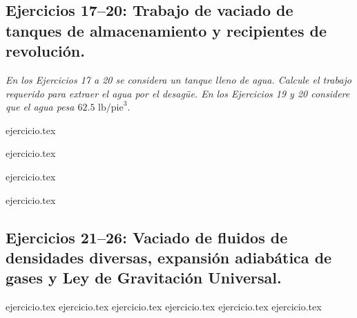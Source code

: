 \subsection*{Ejercicios 17--20: Trabajo de vaciado de tanques de almacenamiento y recipientes de revolución.}

\noindent \textit{En los Ejercicios 17 a 20 se considera un tanque lleno de agua. Calcule el trabajo requerido para extraer el agua por el desagüe. En los Ejercicios 19 y 20 considere que el agua pesa $62.5 \text{ lb/pie}^3$.}

\begin{enumerate}
    \setcounter{enumi}{16}
    \begin{minipage}{0.45\textwidth}
    {ejercicio.tex}
    \end{minipage}%
    \begin{minipage}{0.45\textwidth}
    {ejercicio.tex}
    \end{minipage}
    
    \begin{minipage}{0.45\textwidth}
    {ejercicio.tex}
    \end{minipage}%
    \begin{minipage}{0.45\textwidth}
    {ejercicio.tex}
    \end{minipage}
\end{enumerate}

\subsection*{Ejercicios 21--26: Vaciado de fluidos de densidades diversas, expansión adiabática de gases y Ley de Gravitación Universal.}

\begin{enumerate}
    \setcounter{enumi}{20}
    {ejercicio.tex}
    {ejercicio.tex}
    {ejercicio.tex}
    {ejercicio.tex}
    {ejercicio.tex}
    {ejercicio.tex}
\end{enumerate}

